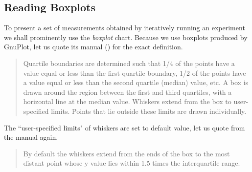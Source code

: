 \subsection{Reading Boxplots}

To present a set of measurements obtained by iteratively running an experiment we shall prominently use the \textit{boxplot} chart. Because we use boxplots produced by GnuPlot, let us quote its manual (\cite{gnuplot-manual}) for the exact definition.

\begin{quote}
Quartile boundaries are determined such that 1/4 of the points have a value equal or less than the first quartile boundary, 1/2 of the points have a value equal or less than the second quartile (median) value, etc. A box is drawn around the region between the first and third quartiles, with a horizontal line at the median value. Whiskers extend from the box to user-specified limits. Points that lie outside these limits are drawn individually.
\end{quote}

The ``user-specified limits" of whiskers are set to default value, let us quote from the manual again.

\begin{quote}
By default the whiskers extend from the ends of the box to the most distant point whose y value lies within 1.5 times the interquartile range.
\end{quote}
